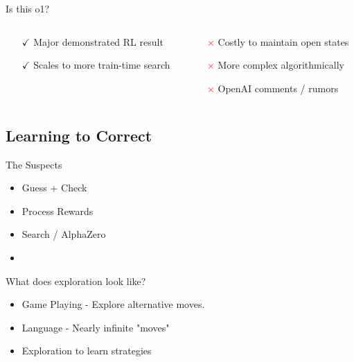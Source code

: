 \documentclass[14pt,aspectratio=169]{beamer}
\begin{document}
\begin{frame}{Is this o1?}
	\begin{columns}
		\begin{column}{0.5\linewidth}
			\begin{itemize}
				\item[$\boldsymbol{\checkmark}$] Major demonstrated RL result
				\item[$\boldsymbol{\checkmark}$] Scales to more train-time search
			\end{itemize}
		\end{column}
		\begin{column}{0.5\linewidth}
			\begin{itemize}
				\item[\textcolor{red}{$\boldsymbol{\times}$}] Costly to maintain open states
				\item[\textcolor{red}{$\boldsymbol{\times}$}] More complex algorithmically
				\item[\textcolor{red}{$\boldsymbol{\times}$}] OpenAI comments / rumors
			\end{itemize}
		\end{column}
	\end{columns}
\end{frame}

\subsection{Learning to Correct}

\begin{frame}{The Suspects}
	\begin{itemize}
		\item Guess + Check
		\item Process Rewards
		\item Search / AlphaZero
		\item {}
	\end{itemize}
\end{frame}

\begin{frame}{What does exploration look like?}
	\begin{itemize}
		\item Game Playing - Explore alternative moves.
		\item Language - Nearly infinite "moves"
		\item Exploration to learn strategies
	\end{itemize}

\end{frame}
\end{document}
